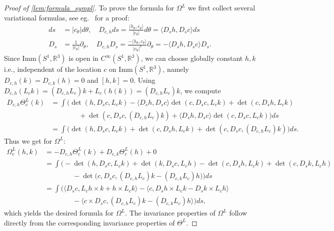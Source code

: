 \documentclass[12pt]{amsart}
\newcommand{\AuthorCOMMENT}[3]{\textcolor{#2}{{[\textbf{#1:} \textsl{#3}}]}}  %
\newcommand{\Sadashige}[1]{\AuthorCOMMENT{Sadashige}{violet}{#1}}
\newcommand{\rev}[1]{#1}
\theoremstyle{definition}
\newcommand{\Imm}{\mathrm{Imm}}
\def\th{\theta}
\def\Th{\Theta}
\def\Om{\Omega}
\def\x{\times}
\def\p{\partial}
\begin{document}
\begin{proof}[Proof of \autoref{lem:formula_sympl}]
To prove the formula for $\Om^L$ we first collect several variational formulas, see eg.~\cite{michor_mumford2006} for a proof:
\begin{align*}
  ds &= |c_\th|d\th, \quad 
  D_{c,h} ds = \frac{\langle h_\th,c_\th\rangle}{|c_\th|} d\th 
  = \langle D_s h, D_s c\rangle ds 
  \\
  D_s &=\frac{1}{|c_\th|}\p_\th, \quad 
  D_{c,h}D_s = \frac{-\langle h_\th, c_\th\rangle}{|c_\th|^3}\p_\th
  = -\langle D_s h, D_s c\rangle D_s.
\end{align*}
Since $\Imm(S^1, \mathbb R^3)$ is open in $C^\infty(S^1,\mathbb R^3)$, we can choose globally constant $h,k$ i.e., independent of the location $c$ on $\Imm(S^1, \mathbb R^3)$, namely \rev{$D_{c,h}(k)=D_{c,k}(h)=0$ and} $[h,k]=0$. \rev{Using $D_{c,h}(L_c k)=(D_{c,h}L_c)k+L_c (h(k))=(D_{c,h}L_c)k$, we} compute
\begin{align*}
    D_{c,h}\Th^L_c(k) &= \int\Big(\det(h, D_s c, L_c k) 
     -\langle D_s h, D_s c\rangle \det(c, D_s c, L_c k)
     +\det(c, D_s h, L_c k)
    \\&\qquad\qquad
     +\det(c, D_s c, (D_{c,h}L_c)k)
     +\langle D_s h, D_s c\rangle\det(c, D_s c, L_c k)\Big)ds 
    \\&
    = \int\Big(\det(h, D_s c, L_c k)+\det(c, D_s h, L_c k) +\det(c, D_s c, (D_{c,h}L_c)k)\Big)ds.
\end{align*}
Thus we get for $\Om^L$:
\begin{equation}
\begin{aligned}    
\Om^L_c(h,k)& = -D_{c,h}\Th^L_c(k) + D_{c,k}\Th^L_c(h) + 0
    \\&
    = \int\Big(-\det(h, D_s c, L_c k) + \det(k, D_s c, L_c h) 
     -\det(c, D_s h, L_c k) + \det(c, D_s k, L_c h)
    \\&\qquad\qquad
     -\det\big(c, D_s c, (D_{c,h}L_c)k - (D_{c,k}L_c)h\big)\Big)ds
    \\&
    =\int\Big(\langle D_s c, L_c h \x k + h\x L_c k\rangle 
     - \langle c, D_s h \x L_c k - D_s k \x L_c h \rangle 
    \\&\qquad\qquad
     - \langle c\x D_s c, (D_{c,h}L_c)k - (D_{c,k}L_c)h\rangle\Big) ds,
\end{aligned}
\end{equation}
which yields the desired formula for $\Om^L$. The invariance properties of $\Om^L$ follow directly from the corresponding invariance properties of $\Theta^L$.
\end{proof}
\end{document}
